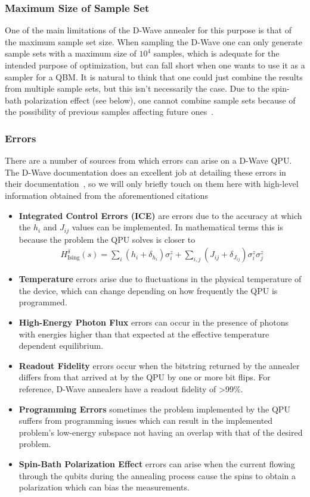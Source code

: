 \subsubsection{Maximum Size of Sample Set}
One of the main limitations of the D-Wave annealer for this purpose is that of the maximum sample set size.
When sampling the D-Wave one can only generate sample sets with a maximum size of \( 10^4 \) samples, which is adequate for the intended purpose of optimization, but can fall short when one wants to use it as a sampler for a QBM.
It is natural to think that one could just combine the results from multiple sample sets, but this isn't necessarily the case.
Due to the spin-bath polarization effect (see below), one cannot combine sample sets because of the possibility of previous samples affecting future ones~\cite{pochart_2021}.

\subsubsection{Errors}
There are a number of sources from which errors can arise on a D-Wave QPU.
The D-Wave documentation does an excellent job at detailing these errors in their documentation~\cite{dwave_ice_errors,dwave_other_errors}, so we will only briefly touch on them here with high-level information obtained from the aforementioned citations
\begin{itemize}
    \item \textbf{Integrated Control Errors (ICE)} are errors due to the accuracy at which the \( h_i \) and \( J_{ij} \) values can be implemented.
        In mathematical terms this is because the problem the QPU solves is closer to
        \begin{align}
            H_{\text{Ising}}^\delta(s) = \sum_i (h_i + \delta_{h_i}) \sigma_i^z + \sum_{i,j} (J_{ij} + \delta_{J_{ij}}) \sigma_i^z \sigma_j^z
        \end{align}
    \item \textbf{Temperature} errors arise due to fluctuations in the physical temperature of the device, which can change depending on how frequently the QPU is programmed.
    \item \textbf{High-Energy Photon Flux} errors can occur in the presence of photons with energies higher than that expected at the effective temperature dependent equilibrium.
    \item \textbf{Readout Fidelity} errors occur when the bitstring returned by the annealer differs from that arrived at by the QPU by one or more bit flips.
        For reference, D-Wave annealers have a readout fidelity of >99\%.
    \item \textbf{Programming Errors} sometimes the problem implemented by the QPU suffers from programming issues which can result in the implemented problem's low-energy subspace not having an overlap with that of the desired problem.
    \item \textbf{Spin-Bath Polarization Effect} errors can arise when the current flowing through the qubits during the annealing process cause the spins to obtain a polarization which can bias the measurements.
\end{itemize}
